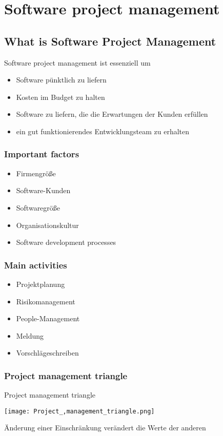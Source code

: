 \section{Software project management}
\subsection{What is Software Project Management}
Software project management ist essenziell um
\begin{itemize}
	\item Software pünktlich zu liefern
	\item Kosten im Budget zu halten
	\item Software zu liefern, die die Erwartungen der Kunden erfüllen
	\item ein gut funktionierendes Entwicklungsteam zu erhalten
\end{itemize}
\subsubsection{Important factors}
\begin{itemize}
	\item Firmengröße
	\item Software-Kunden
	\item Softwaregröße
	\item Organisationskultur
	\item Software development processes
\end{itemize}
\subsubsection{Main activities}
\begin{itemize}
	\item Projektplanung
	\item Risikomanagement
	\item People-Management
	\item Meldung
	\item Vorschlägeschreiben
\end{itemize}
\subsubsection{Project management triangle}
\begin{table}[H]
\caption{Project management triangle}
\begin{center}
	\texttt{[image: Project\_,management\_triangle.png]}
\end{center}	
\end{table}
Änderung einer Einschränkung verändert die Werte der anderen 

